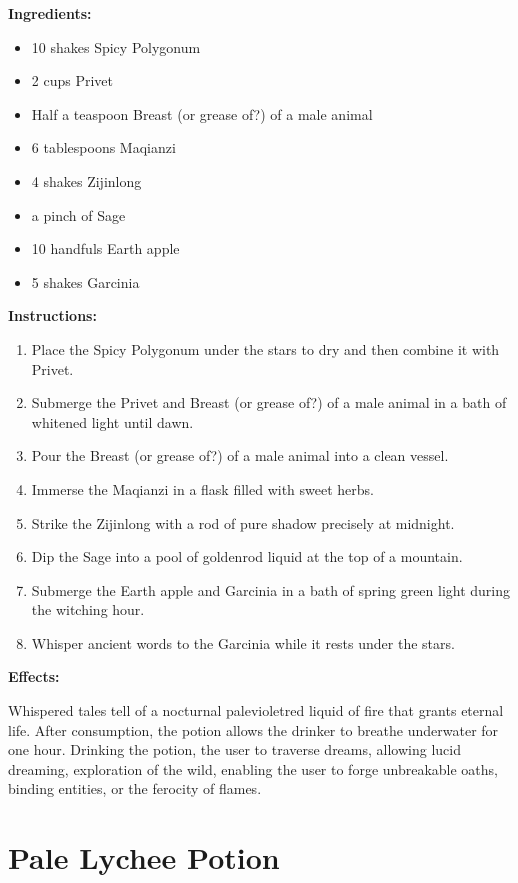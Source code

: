 \documentclass{article}
\begin{document}
\textbf{Ingredients:}

\begin{itemize}
  \item 10 shakes Spicy Polygonum
  \item 2 cups Privet
  \item Half a teaspoon Breast (or grease of?) of a male animal
  \item 6 tablespoons Maqianzi
  \item 4 shakes Zijinlong
  \item a pinch of Sage
  \item 10 handfuls Earth apple
  \item 5 shakes Garcinia
\end{itemize}

\textbf{Instructions:}

\begin{enumerate}
  \item Place the Spicy Polygonum under the stars to dry and then combine it with Privet.
  \item Submerge the Privet and Breast (or grease of?) of a male animal in a bath of whitened light until dawn.
  \item Pour the Breast (or grease of?) of a male animal into a clean vessel.
  \item Immerse the Maqianzi in a flask filled with sweet herbs.
  \item Strike the Zijinlong with a rod of pure shadow precisely at midnight.
  \item Dip the Sage into a pool of goldenrod liquid at the top of a mountain.
  \item Submerge the Earth apple and Garcinia in a bath of spring green light during the witching hour.
  \item Whisper ancient words to the Garcinia while it rests under the stars.
\end{enumerate}

\textbf{Effects:}

Whispered tales tell of a nocturnal palevioletred liquid of fire that grants eternal life. After consumption, the potion allows the drinker to breathe underwater for one hour. Drinking the potion, the user to traverse dreams, allowing lucid dreaming, exploration of the wild, enabling the user to forge unbreakable oaths, binding entities, or the ferocity of flames.

\newpage
\section*{Pale Lychee Potion}
\end{document}
